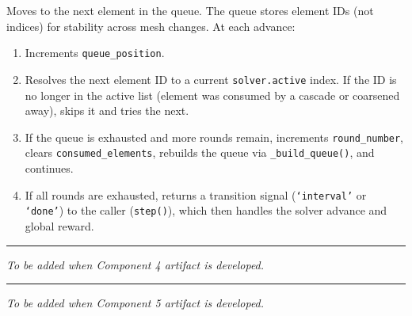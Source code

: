 \documentclass[11pt]{article}
\newcommand{\method}[1]{\textcolor{codeblue}{\texttt{#1}}}
\begin{document}
\vspace{0.1cm}
\noindent Moves to the next element in the queue. The queue stores element IDs (not indices) for stability across mesh changes. At each advance:
\begin{enumerate}[leftmargin=1.5em, itemsep=2pt]
    \item Increments \method{queue\_position}.
    \item Resolves the next element ID to a current \method{solver.active} index. If the ID is no longer in the active list (element was consumed by a cascade or coarsened away), skips it and tries the next.
    \item If the queue is exhausted and more rounds remain, increments \method{round\_number}, clears \method{consumed\_elements}, rebuilds the queue via \method{\_build\_queue()}, and continues.
    \item If all rounds are exhausted, returns a transition signal (\texttt{`interval'} or \texttt{`done'}) to the caller (\method{step()}), which then handles the solver advance and global reward.
\end{enumerate}

\vspace{0.5cm}
\begin{center}
\rule{0.6\textwidth}{0.4pt}
\end{center}
\vspace{0.3cm}

\noindent{\large\textbf{\textcolor{elementcolor}{Component 4: Observation Space}}}

\vspace{0.15cm}
\noindent\textit{To be added when Component 4 artifact is developed.}

\vspace{0.5cm}
\begin{center}
\rule{0.6\textwidth}{0.4pt}
\end{center}
\vspace{0.3cm}

\noindent{\large\textbf{\textcolor{roundcolor}{Component 5: Queue Mechanics}}}

\vspace{0.15cm}
\noindent\textit{To be added when Component 5 artifact is developed.}
\end{document}
